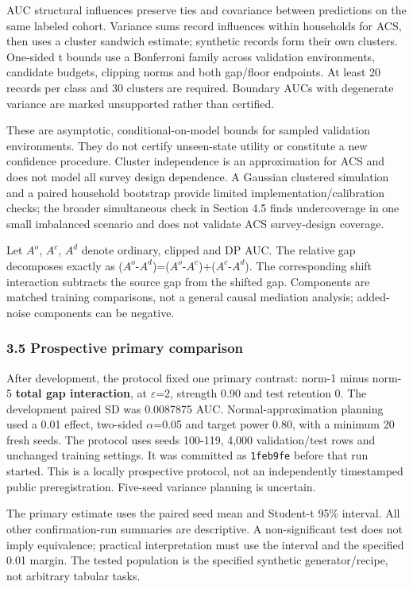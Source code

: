 \documentclass[
  10pt,
]{article}
\begin{document}
AUC structural influences preserve ties and covariance between
predictions on the same labeled cohort. Variance sums record influences
within households for ACS, then uses a cluster sandwich estimate;
synthetic records form their own clusters. One-sided t bounds use a
Bonferroni family across validation environments, candidate budgets,
clipping norms and both gap/floor endpoints. At least 20 records per
class and 30 clusters are required. Boundary AUCs with degenerate
variance are marked unsupported rather than certified.

These are asymptotic, conditional-on-model bounds for sampled validation
environments. They do not certify unseen-state utility or constitute a
new confidence procedure. Cluster independence is an approximation for
ACS and does not model all survey design dependence. A Gaussian
clustered simulation and a paired household bootstrap provide limited
implementation/calibration checks; the broader simultaneous check in
Section 4.5 finds undercoverage in one small imbalanced scenario and
does not validate ACS survey-design coverage.

Let \(A^o\), \(A^c\), \(A^d\) denote ordinary, clipped and DP AUC. The
relative gap decomposes exactly as
(\(A^o\)-\(A^d\))=(\(A^o\)-\(A^c\))+(\(A^c\)-\(A^d\)). The corresponding
shift interaction subtracts the source gap from the shifted gap.
Components are matched training comparisons, not a general causal
mediation analysis; added-noise components can be negative.

\hypertarget{prospective-primary-comparison}{%
\subsubsection{3.5 Prospective primary
comparison}\label{prospective-primary-comparison}}

After development, the protocol fixed one primary contrast: norm-1 minus
norm-5 \textbf{total gap interaction}, at \(\varepsilon\)=2, strength
0.90 and test retention 0. The development paired SD was 0.0087875 AUC.
Normal-approximation planning used a 0.01 effect, two-sided
\(\alpha\)=0.05 and target power 0.80, with a minimum 20 fresh seeds.
The protocol uses seeds 100-119, 4,000 validation/test rows and
unchanged training settings. It was committed as \texttt{1feb9fe} before
that run started. This is a locally prospective protocol, not an
independently timestamped public preregistration. Five-seed variance
planning is uncertain.

The primary estimate uses the paired seed mean and Student-t 95\%
interval. All other confirmation-run summaries are descriptive. A
non-significant test does not imply equivalence; practical
interpretation must use the interval and the specified 0.01 margin. The
tested population is the specified synthetic generator/recipe, not
arbitrary tabular tasks.
\end{document}
